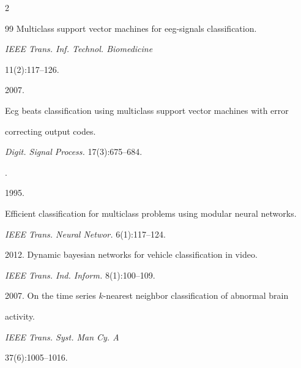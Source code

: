 \begin{multicols}{2}
{{\begin{thebibliography}{99}
Multiclass support vector machines for eeg-signals classification.


\textit{IEEE Trans. Inf. Technol. Biomedicine}


11(2):117--126.









2007.


Ecg beats classification using multiclass support vector machines with error


  correcting output codes.


\textit{Digit. Signal Process.} 17(3):675--684.







.


1995.


Efficient classification for multiclass problems using modular neural networks.


\textit{IEEE Trans. Neural Networ.} 6(1):117--124.









2012. Dynamic bayesian networks for vehicle classification in video.


\textit{IEEE Trans. Ind. Inform.} 8(1):100--109.









2007. On the time series $k$-nearest neighbor classification of abnormal brain


  activity.


\textit{IEEE Trans. Syst. Man Cy. A}


37(6):1005--1016.
















\end{thebibliography}}}
\end{multicols}
